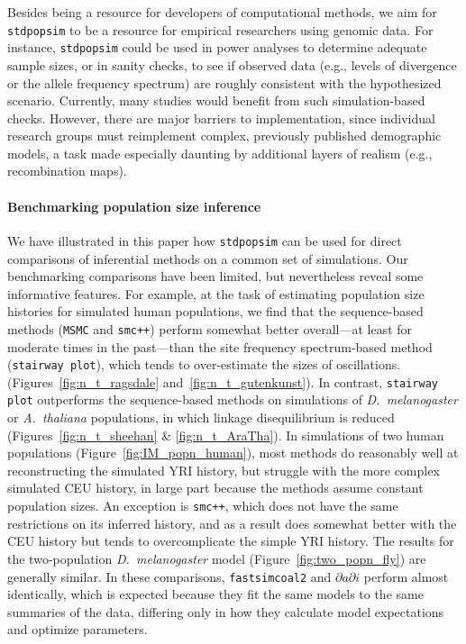\documentclass[12pt,halfline,a4paper]{ouparticle}
\newcommand{\stdpopsim}{\texttt{stdpopsim}\xspace}
\newcommand{\dadi}{$\partial a \partial i$\xspace}
\newcommand{\MSMC}{\texttt{MSMC}\xspace}
\newcommand{\smcpp}{\texttt{smc++}\xspace}
\newcommand{\stairwayplot}{\texttt{stairway plot}\xspace}
\newcommand{\fastsimcoal}{\texttt{fastsimcoal2}\xspace}
\begin{document}
Besides being a resource for developers of computational methods,
we aim for \stdpopsim to be a resource for empirical researchers using genomic data.
For instance, \stdpopsim could be used in power analyses to determine adequate sample sizes,
or in sanity checks, to see if observed data
(e.g., levels of divergence or the allele frequency spectrum)
are roughly consistent with the hypothesized scenario.
Currently, many studies would benefit from such simulation-based checks.
However,  there are major barriers to implementation,
since individual research groups must reimplement complex, previously published demographic models,
a task made especially daunting by additional layers of realism (e.g., recombination maps).

\paragraph{Benchmarking population size inference}
We have illustrated in this paper how \stdpopsim can be used for direct
comparisons of inferential methods on a common set of simulations. Our
benchmarking comparisons have been limited, but nevertheless
reveal some informative features.
For example, at the task of estimating population size histories for simulated human
populations, we find that the sequence-based methods (\MSMC and \smcpp)
perform somewhat better overall---at least for moderate times in the past---than
the site frequency spectrum-based method (\stairwayplot),
which tends to over-estimate the sizes of oscillations.
(Figures~\ref{fig:n_t_ragsdale} and~\ref{fig:n_t_gutenkunst}).
In contrast, \stairwayplot outperforms the sequence-based methods
on simulations of \textit{D.~melanogaster} or \textit{A.~thaliana} populations,
in which linkage disequilibrium is reduced (Figures~\ref{fig:n_t_sheehan} \& \ref{fig:n_t_AraTha}).
In simulations of two human populations
(Figure~\ref{fig:IM_popn_human}), most methods do reasonably well at
reconstructing the simulated YRI history, but struggle with the more complex simulated CEU
history, in large part because the methods assume constant population sizes.
An exception is \smcpp, which does not have the same
restrictions on its inferred history, and as a result does somewhat better
with the CEU history but tends to overcomplicate the simple YRI history.
The results for
the two-population \textit{D.~melanogaster} model (Figure~\ref{fig:two_popn_fly})
are generally similar.
In these comparisons, \fastsimcoal and \dadi perform almost identically, which is expected because they fit the same models to the same summaries of the data, differing only in how they calculate model expectations and optimize parameters.
\end{document}
